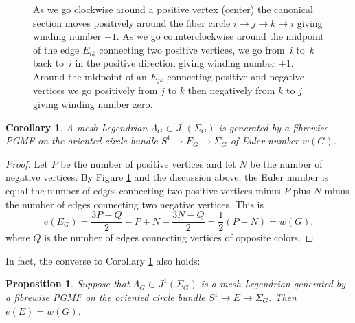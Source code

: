 \documentclass[11pt]{article}
\newcommand{\smaller}{\small}
\numberwithin{equation}{section}\providecommand{\dpl}{\displaystyle}
\theoremstyle{plain}
\newtheorem{proposition}[theorem]{Proposition}
\newtheorem{corollary}[theorem]{Corollary}
\theoremstyle{definition}
\begin{document}
\begin{figure}[htbp]
\begin{center}
\caption{\smaller As we go clockwise around a positive vertex (center) the canonical section moves positively around the fiber circle $i\to j\to k\to i$ giving winding number $-1$. As we go counterclockwise around the midpoint of the edge $E_{ik}$ connecting two positive vertices, we go from~$i$ to~$k$ back to~$i$ in the positive direction giving winding number $+1$. Around the midpoint of an $E_{jk}$ connecting positive and negative vertices we go positively from $j$ to $k$ then negatively from $k$ to $j$ giving winding number zero.}
\label{Fig: 3 circles}
\end{center}
\end{figure}

\begin{corollary}\label{generation}
A mesh Legendrian $\Lambda_G \subset J^1(\Sigma_G)$ is generated by a fibrewise PGMF on the oriented circle bundle $S^1 \to E_G \to \Sigma_G$ of Euler number $w(G)$.
\end{corollary}

\begin{proof}
Let $P$ be the number of positive vertices and let $N$ be the number of negative vertices. By Figure \ref{Fig: 3 circles} and the discussion above, the Euler number is equal the number of edges connecting two positive vertices minus $P$ plus $N$ minus the number of edges connecting two negative vertices. This is
\[
e(E_G)=\frac{3P-Q}2-P+N-\frac{3N-Q}2=\frac12(P-N)=w(G).
\]
where $Q$ is the number of edges connecting vertices of opposite colors. \end{proof}

In fact, the converse to Corollary \ref{generation} also holds:

\begin{proposition}\label{euler for circle}
Suppose that $\Lambda_G \subset J^1(\Sigma_G)$ is a mesh Legendrian generated by a fibrewise PGMF on the oriented circle bundle $S^1 \to E \to \Sigma_G$. Then $e(E)=w(G)$.
\end{proposition}
\end{document}
